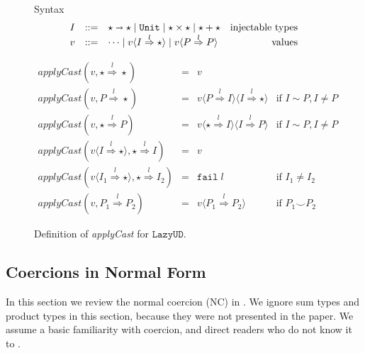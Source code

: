 \documentclass[acmsmall,review,anonymous]{acmart}\settopmatter{printfolios=true,printccs=false,printacmref=false}
\newcommand{\stxrule}[3]{#1 & ::= & #3 & \text{#2}\\}
\newcommand{\lazyUD}{$\mathtt{Lazy UD}$}
\newcommand{\POOunit}[0]{\mathtt{Unit}}
\newcommand{\POOfun}[2]{#1 \shortrightarrow #2}
\newcommand{\cOOcast}[3]{#1 \overset{#2}{\Rightarrow} #3}
\newcommand{\vOOcast}[2]{#1\langle#2\rangle}
\newcommand{\rOOfail}[1]{\mathtt{fail}\;#1}
\begin{document}
\begin{figure}

  Syntax
  \[
  \begin{array}{rclr}
     \stxrule{I}{injectable types}{
		\POOfun{\star}{\star} \mid \POOunit \mid \star \times \star \mid \star + \star}
    \stxrule{v}{values}{
      \cdots \mid 
      \vOOcast{v}{ \cOOcast{I}{l}{\star} } \mid
      \vOOcast{v}{ \cOOcast{P}{l}{P} }
    }
  \end{array}
  \]
  
  \[
  \begin{array}{rclr}
    \mathit{applyCast}(v, \cOOcast{\star}{l}{\star} ) &=& v \\
    \mathit{applyCast}(v, \cOOcast{P}{l}{\star}) &=&
        v \langle \cOOcast{P}{l}{I} \rangle
          \langle \cOOcast{I}{l}{\star} \rangle
        & \text{if } I \sim P, I \neq P \\  
    \mathit{applyCast}(v, \cOOcast{\star}{l}{P}) &=&          
        v \langle \cOOcast{\star}{l}{I} \rangle
          \langle \cOOcast{I}{l}{P} \rangle
        & \text{if } I \sim P, I \neq P \\  
  \mathit{applyCast}(v \langle \cOOcast{I}{l}{\star} \rangle , \cOOcast{\star}{l}{I}) &=& v \\
  \mathit{applyCast}(v \langle \cOOcast{I_1}{l}{\star} \rangle , \cOOcast{\star}{l}{I_2}) &=& \rOOfail{l} & \text{if } I_1 \neq I_2 \\
  \mathit{applyCast}(v, \cOOcast{P_1}{l}{P_2}) &=&
     v \langle \cOOcast{P_1}{l}{P_2} \rangle & \text{if } P_1 \smile P_2
  \end{array}
  \]


  \caption{Definition of \textit{applyCast} for \lazyUD{}.}
  \label{fig:apply-Cast-UD}
\end{figure}


\clearpage
\pagebreak

\subsection{Coercions in Normal Form} \label{sec:coercion-calculus}

In this section we review the normal coercion (NC) in 
\citet{siek2012interpretations}. We ignore sum types and product types in this 
section, because they were not presented in the paper. We assume a basic 
familiarity with coercion, and direct readers who do not know it to 
\citet{siek2012interpretations}.
\end{document}
